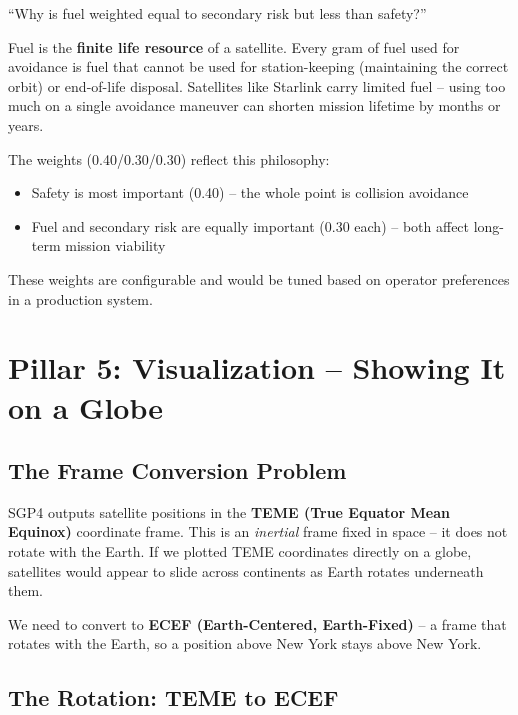 \documentclass[12pt,a4paper]{article}
\begin{document}
\begin{questionbox}
``Why is fuel weighted equal to secondary risk but less than safety?''
\end{questionbox}
\begin{answerbox}
Fuel is the \textbf{finite life resource} of a satellite. Every gram of fuel used for avoidance is fuel that cannot be used for station-keeping (maintaining the correct orbit) or end-of-life disposal. Satellites like Starlink carry limited fuel -- using too much on a single avoidance maneuver can shorten mission lifetime by months or years.

The weights (0.40/0.30/0.30) reflect this philosophy:
\begin{itemize}
    \item Safety is most important (0.40) -- the whole point is collision avoidance
    \item Fuel and secondary risk are equally important (0.30 each) -- both affect long-term mission viability
\end{itemize}
These weights are configurable and would be tuned based on operator preferences in a production system.
\end{answerbox}

\newpage
\section{Pillar 5: Visualization -- Showing It on a Globe}

\subsection{The Frame Conversion Problem}

SGP4 outputs satellite positions in the \textbf{TEME (True Equator Mean Equinox)} coordinate frame. This is an \textit{inertial} frame fixed in space -- it does not rotate with the Earth. If we plotted TEME coordinates directly on a globe, satellites would appear to slide across continents as Earth rotates underneath them.

We need to convert to \textbf{ECEF (Earth-Centered, Earth-Fixed)} -- a frame that rotates with the Earth, so a position above New York stays above New York.

\subsection{The Rotation: TEME to ECEF}
\end{document}
